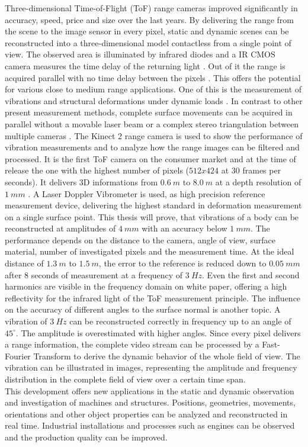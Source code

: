 Three-dimensional Time-of-Flight (ToF) range cameras improved significantly in accuracy, speed, price and size over the last years. By delivering the range from the scene to the image sensor in every pixel, static and dynamic scenes can be reconstructed into a three-dimensional model contactless from a single point of view. The observed area is illuminated by infrared diodes and a IR CMOS camera measures the time delay of the returning light \cite{thierryoggietof}. Out of it the range is acquired parallel with no time delay between the pixels \cite{litime}. This offers the potential for various close to medium range applications. One of this is the measurement of vibrations and structural deformations under dynamic loads \cite{qi2014structural}. In contrast to other present measurement methods, complete surface movements can be acquired in parallel without a movable laser beam or a complex stereo triangulation between multiple cameras . The Kinect 2 range camera is used to show the performance of vibration measurements and to analyze how the range images can be filtered and processed. It is the first ToF camera on the consumer market and at the time of release the one with the highest number of pixels ($512x424$ at 30 frames per seconds). It delivers 3D informations from $0.6~m$ to $8.0~m$ at a depth resolution of $1~mm$ \cite{sell2014xbox}. A Laser Doppler Vibrometer is used, as high precision reference measurement device, delivering the highest standard in deformation measurement on a single surface point. This thesis will prove, that vibrations of a body can be reconstructed at amplitudes of $4~mm$ with an accuracy below $1~mm$. The performance depends on the distance to the camera, angle of view, surface material, number of investigated pixels and the measurement time. At the ideal distance of $1.3~m$ to $1.5~m$, the error to the reference is reduced down to $0.05~mm$ after 8 seconds of measurement at a frequency of $3~Hz$. Even the first and second harmonics are visible in the frequency domain on white paper, offering a high reflectivity for the infrared light of the ToF measurement principle. The influence on the accuracy of different angles to the surface normal is another topic. A vibration of $3~Hz$ can be reconstructed correctly in frequency up to an angle of $45^\circ$. The amplitude is overestimated with higher angles. Since every pixel delivers a range information, the complete video stream can be processed by a Fast-Fourier Transform to derive the dynamic behavior of the whole field of view. The vibration can be illustrated in images, representing the amplitude and frequency distribution in the complete field of view over a certain time span.\\

This development offers new applications in the static and dynamic observation and investigation of machines and structures. Positions, geometries, movements, orientations and other object properties can be analyzed and reconstructed in real time. Industrial installations and processes such as engines can be observed and the production quality can be improved.